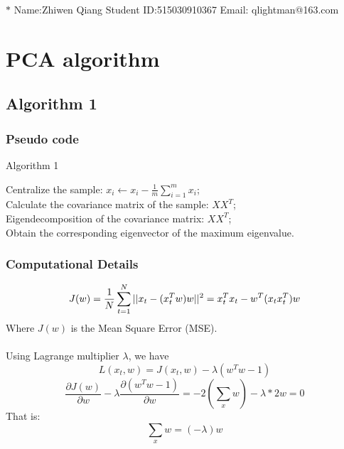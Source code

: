 \documentclass{article}
\theoremstyle{definition}
\numberwithin{equation}{section}
\numberwithin{figure}{section}
\begin{document}
\noindent

\noindent{}
\begin{center}

\footnotesize{\color{steelblue}$*$ Name:Zhiwen Qiang  \quad Student ID:515030910367 \quad Email: qlightman@163.com}
\end{center}

\section{PCA algorithm}
\subsection{Algorithm 1}
\subsubsection{Pseudo code}
\begin{algorithm}[H]
\BlankLine
{}
\caption{Algorithm 1}\label{Algorithm 1}
\BlankLine
Centralize the sample: $x_i \leftarrow x_i-\frac{1}{m}\sum_{i=1}^mx_i$;\\
Calculate the covariance matrix of the sample: $XX^T$;\\
Eigendecomposition of the covariance matrix: $XX^T$;\\
Obtain the corresponding eigenvector of the maximum eigenvalue.
\end{algorithm}
\subsubsection{Computational Details}
\begin{equation}
J(w)=\frac{1}{N}\sum^N_{t=1}||x_t-(x_t^Tw)w||^2\\
=x_t^Tx_t-w^T(x_tx_t^T)w
\end{equation}
Where $J(w)$ is the Mean Square Error (MSE).\\\\
Using Lagrange multiplier $\lambda$, we have 
\begin{equation}
L({x_t},w)=J({x_t},w)-\lambda(w^Tw-1)
\end{equation}
\begin{equation}
\frac{\partial J(w)}{\partial w}-\lambda\frac{\partial(w^Tw-1)}{\partial w}
=-2(\sum_xw)-\lambda*2w=0
\end{equation}
That is:
\begin{equation}
\sum_xw=(-\lambda)w
\end{equation}
\end{document}
